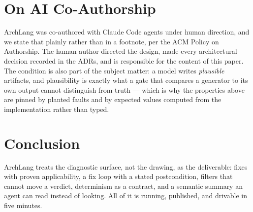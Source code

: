 \documentclass[10pt,conference]{IEEEtran}
\begin{document}
\section{On AI Co-Authorship}

ArchLang was co-authored with Claude Code agents under human direction, and we state
that plainly rather than in a footnote, per the ACM Policy on Authorship. The human
author directed the design, made every architectural decision recorded in the
\factAdrs{} ADRs, and is responsible for the content of this paper. The condition is
also part of the subject matter: a model writes \emph{plausible} artifacts, and
plausibility is exactly what a gate that compares a generator to its own output cannot
distinguish from truth --- which is why the properties above are pinned by planted
faults and by expected values computed from the implementation rather than typed.

\section{Conclusion}

ArchLang treats the diagnostic surface, not the drawing, as the deliverable: fixes
with proven applicability, a fix loop with a stated postcondition, filters that cannot
move a verdict, determinism as a contract, and a semantic summary an agent can read
instead of looking. All of it is running, published, and drivable in five minutes.

\label{refsstart}


\end{document}
